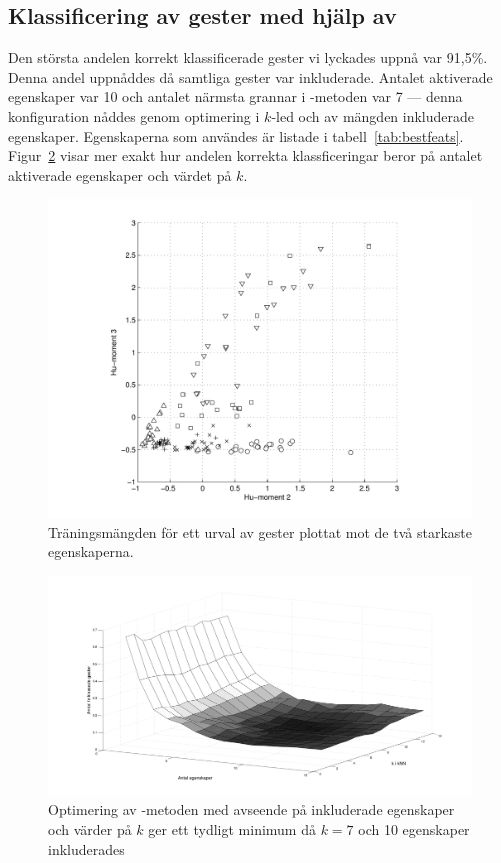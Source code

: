 \documentclass[../rapport_MVEX01-11-05]{subfiles}
\begin{document}
\subsection{Klassificering av gester med hjälp av \knn}
Den största andelen korrekt klassificerade gester vi lyckades uppnå var 91,5\%.
Denna andel uppnåddes då samtliga gester var inkluderade. Antalet aktiverade
egenskaper var 10 och antalet närmsta grannar i \knn-metoden var 7 --- denna
konfiguration nåddes genom optimering i $k$-led och av mängden inkluderade
egenskaper. Egenskaperna som
användes är listade i tabell~\ref{tab:bestfeats}.
Figur~\ref{fig:knn-optimering} visar mer exakt hur andelen korrekta
klassficeringar beror på antalet aktiverade egenskaper och värdet på $k$.

\begin{figure}[tbp]
  \centering
  \includegraphics[width=\textwidth,trim=2cm 0.5cm 2cm 0,clip=true]{bilder/feats-10+11}
  \caption{Träningsmängden för ett urval av gester plottat mot de två starkaste
  egenskaperna.}
  \label{fig:feats1011}
\end{figure}

\begin{figure}[tbp]
    \begin{center}
        \includegraphics[trim=2cm 2cm 2cm 1.8cm,width=\columnwidth,clip=true]{bilder/knn_optimering}
    \end{center}
    \caption{Optimering av \knn-metoden med avseende på inkluderade egenskaper
och värder på $k$ ger ett tydligt minimum då $k=7$ och 10 egenskaper inkluderades}
    \label{fig:knn-optimering}
\end{figure}
\end{document}
